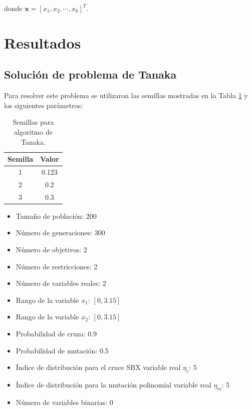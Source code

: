 \documentclass[conference]{IEEEtran}
\begin{document}
donde $\mathbf{x} = \left[ x_{1}, x_{2}, \cdots, x_{6} \right]^{T}$.
\section{Resultados}

\subsection{Solución de problema de Tanaka}

Para resolver este problema se utilizaron las semillas mostradas en la Tabla \ref{tab:tanaka} y los siguientes parámetros:

	\begin{table}[!hbp]   
	\caption{Semillas para algoritmo de Tanaka.}                                                                                                                
		\centering                                       
		\begin{tabular}{cc}
			\hline                                             
			Semilla & Valor \\                     
			\hline 
			1 & 0.123\\                                            
			2 & 0.2\\
			3 & 0.3\\
			\hline                                             
		\end{tabular}
		\label{tab:tanaka}
	\end{table}	


\begin{itemize}
\item Tamaño de población: 200
\item Número de generaciones: 300
\item Número de objetivos: 2
\item Número de restricciones: 2
\item Número de variables reales: 2
\item Rango de la variable $x_{1}$: $[ 0,3.15]$
\item Rango de la variable $x_{2}$:  $[ 0,3.15]$
\item Probabilidad de cruza: 0.9
\item Probabilidad de mutación: 0.5
\item Índice de distribución para el cruce SBX variable real $\eta_{c}$:   5 
\item Índice de distribución para la mutación polinomial variable real $\eta_{m}$: 5
\item Número de variables binarias: 0
\end{itemize}
\end{document}
